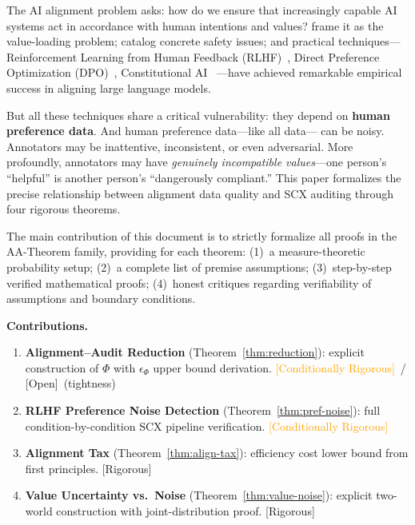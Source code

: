 \documentclass[12pt,a4paper]{article}
\newcommand{\rigorous}{\textcolor{green!50!black}{\small\textsf{[Rigorous]}}}
\newcommand{\conditionallyrigorous}{\textcolor{orange}{\small\textsf{[Conditionally Rigorous]}}}
\newcommand{\openquest}{\textcolor{red!70!black}{\small\textsf{[Open]}}}
\begin{document}
The AI alignment problem asks: how do we ensure that increasingly capable AI
systems act in accordance with human intentions and values?
\citet{russell2019human} frame it as the value-loading problem;
\citet{amodei2016concrete} catalog concrete safety issues; and practical
techniques---Reinforcement Learning from Human Feedback
(RLHF)~\citep{christiano2017deep}, Direct Preference Optimization
(DPO)~\citep{rafailov2024direct}, Constitutional AI~\citep{bai2022constitutional}
---have achieved remarkable empirical success in aligning large language models.

But all these techniques share a critical vulnerability: they depend on
\textbf{human preference data}.  And human preference data---like all data---
can be noisy.  Annotators may be inattentive, inconsistent, or even
adversarial.  More profoundly, annotators may have \emph{genuinely
incompatible values}---one person's ``helpful'' is another person's
``dangerously compliant.''  This paper formalizes the precise relationship
between alignment data quality and \textsf{SCX} auditing through four rigorous theorems.

The main contribution of this document is to strictly formalize all proofs in the AA-Theorem family, providing for each theorem:
(1)~a measure-theoretic probability setup; (2)~a complete list of premise assumptions;
(3)~step-by-step verified mathematical proofs; (4)~honest critiques regarding verifiability of assumptions and boundary conditions.

\medskip\noindent
\textbf{Contributions.}
\begin{enumerate}[label=(\arabic*)]
    \item \textbf{Alignment--Audit Reduction} (Theorem~\ref{thm:reduction}):
          explicit construction of $\Phi$ with $\epsilon_\Phi$ upper bound
          derivation. \conditionallyrigorous~/ \openquest~(tightness)
    \item \textbf{RLHF Preference Noise Detection} (Theorem~\ref{thm:pref-noise}):
          full condition-by-condition \textsf{SCX} pipeline verification. \conditionallyrigorous
    \item \textbf{Alignment Tax} (Theorem~\ref{thm:align-tax}):
          efficiency cost lower bound from first principles. \rigorous
    \item \textbf{Value Uncertainty vs.\ Noise} (Theorem~\ref{thm:value-noise}):
          explicit two-world construction with joint-distribution proof.
          \rigorous
\end{enumerate}
\end{document}
